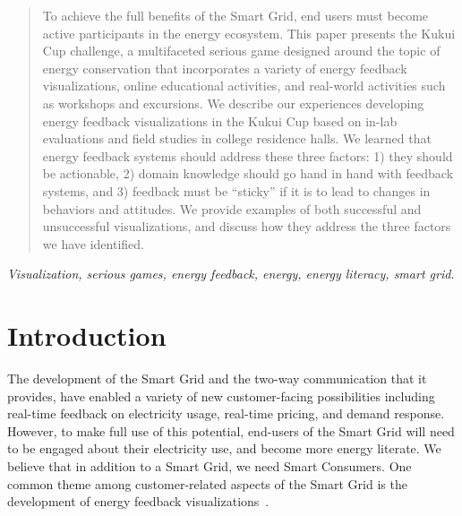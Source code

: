 \documentclass[10pt, conference, compsocconf]{IEEEtran-old}
\begin{document}
\begin{abstract}
To achieve the full benefits of the Smart Grid, end users must become active participants in the energy ecosystem. This paper presents the Kukui Cup challenge, a multifaceted serious game designed around the topic of energy conservation that incorporates a variety of energy feedback visualizations, online educational activities, and real-world activities such as workshops and excursions. We describe our experiences developing energy feedback visualizations in the Kukui Cup based on in-lab evaluations and field studies in college residence halls. We learned that energy feedback systems should address these three factors: 1) they should be actionable, 2) domain knowledge should go hand in hand with feedback systems, and 3) feedback must be ``sticky'' if it is to lead to changes in behaviors and attitudes. We provide examples of both successful and unsuccessful visualizations, and discuss how they address the three factors we have identified.
\end{abstract}

\begin{IEEEkeywords}
\emph{Visualization, serious games, energy feedback, energy, energy literacy, smart grid.}
\end{IEEEkeywords}


%
\IEEEpeerreviewmaketitle



\section{Introduction}

The development of the Smart Grid and the two-way communication that it provides, have enabled a variety of new customer-facing possibilities including real-time feedback on electricity usage, real-time pricing, and demand response. However, to make full use of this potential, end-users of the Smart Grid will need to be engaged about their electricity use, and become more energy literate. We believe that in addition to a Smart Grid, we need Smart Consumers. One common theme among customer-related aspects of the Smart Grid is the development of energy feedback visualizations~\cite{csdl2-12-12}.
\end{document}

